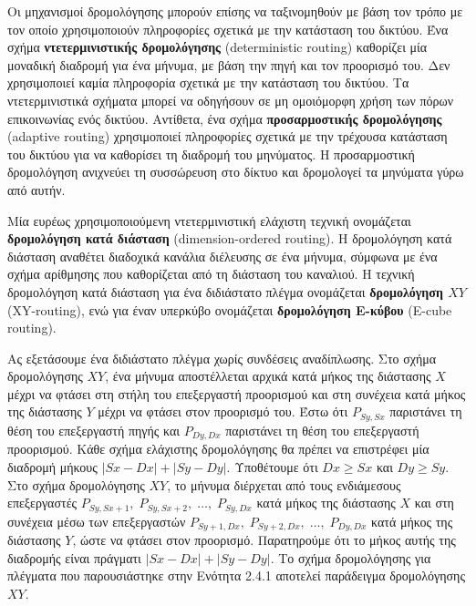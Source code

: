 \documentclass[12pt,a4paper]{article}
\begin{document}
Οι μηχανισμοί δρομολόγησης μπορούν επίσης να ταξινομηθούν με βάση τον 
τρόπο με τον οποίο χρησιμοποιούν πληροφορίες σχετικά με την κατάσταση του 
δικτύου. Ένα σχήμα \textbf{ντετερμινιστικής δρομολόγησης} 
(\foreignlanguage{english}{deterministic routing}) καθορίζει μία μοναδική 
διαδρομή για ένα μήνυμα, με βάση την πηγή και τον προορισμό του. Δεν 
χρησιμοποιεί καμία πληροφορία σχετικά με την κατάσταση του δικτύου.
Τα ντετερμινιστικά σχήματα μπορεί να οδηγήσουν σε μη ομοιόμορφη χρήση των 
πόρων επικοινωνίας ενός δικτύου. Αντίθετα, ένα σχήμα \textbf{προσαρμοστικής δρομολόγησης}
(\foreignlanguage{english}{adaptive routing}) χρησιμοποιεί πληροφορίες 
σχετικά με την τρέχουσα κατάσταση του δικτύου για να καθορίσει τη διαδρομή 
του μηνύματος. Η προσαρμοστική δρομολόγηση ανιχνεύει τη συσσώρευση στο 
δίκτυο και δρομολογεί τα μηνύματα γύρω από αυτήν.

Μία ευρέως χρησιμοποιούμενη ντετερμινιστική ελάχιστη τεχνική ονομάζεται
\textbf{δρομολόγηση κατά διάσταση} (\foreignlanguage{english}{dimension-ordered routing}). 
Η δρομολόγηση κατά διάσταση αναθέτει διαδοχικά κανάλια διέλευσης σε ένα 
μήνυμα, σύμφωνα με ένα σχήμα αρίθμησης που καθορίζεται από τη διάσταση του 
καναλιού. Η τεχνική δρομολόγηση κατά διάσταση για ένα διδιάστατο πλέγμα
ονομάζεται \textbf{δρομολόγηση $XY$} (\foreignlanguage{english}{XY-routing}),
ενώ για έναν υπερκύβο ονομάζεται \textbf{δρομολόγηση E-κύβου} 
(\foreignlanguage{english}{E-cube routing}).

Ας εξετάσουμε ένα διδιάστατο πλέγμα χωρίς συνδέσεις αναδίπλωσης. Στο σχήμα
δρομολόγησης $XY$, ένα μήνυμα αποστέλλεται αρχικά κατά μήκος της διάστασης 
$X$ μέχρι να φτάσει στη στήλη του επεξεργαστή προορισμού και στη συνέχεια 
κατά μήκος της διάστασης $Y$ μέχρι να φτάσει στον προορισμό του. Έστω ότι 
$P_{Sy,Sx}$ παριστάνει τη θέση του επεξεργαστή πηγής και $P_{Dy,Dx}$ 
παριστάνει τη θέση του επεξεργαστή προορισμού. Κάθε σχήμα ελάχιστης 
δρομολόγησης θα πρέπει να επιστρέφει μία διαδρομή μήκους 
$|Sx-Dx| + |Sy-Dy|$. Υποθέτουμε ότι $Dx \geq Sx$ και $Dy \geq Sy$.
Στο σχήμα δρομολόγησης $XY$, το μήνυμα διέρχεται από τους ενδιάμεσους 
επεξεργαστές \(P_{Sy,Sx+1},\; P_{Sy,Sx+2},\; \dots,\; P_{Sy,Dx}\)
κατά μήκος της διάστασης $X$ και στη συνέχεια μέσω των επεξεργαστών
\(P_{Sy+1,Dx},\; P_{Sy+2,Dx},\; \dots,\; P_{Dy,Dx}\) κατά μήκος της 
διάστασης $Y$, ώστε να φτάσει στον προορισμό.
Παρατηρούμε ότι το μήκος αυτής της διαδρομής είναι πράγματι
$|Sx-Dx| + |Sy-Dy|$. Το σχήμα δρομολόγησης για πλέγματα που παρουσιάστηκε 
στην Ενότητα 2.4.1 αποτελεί παράδειγμα δρομολόγησης $XY$.
\end{document}
